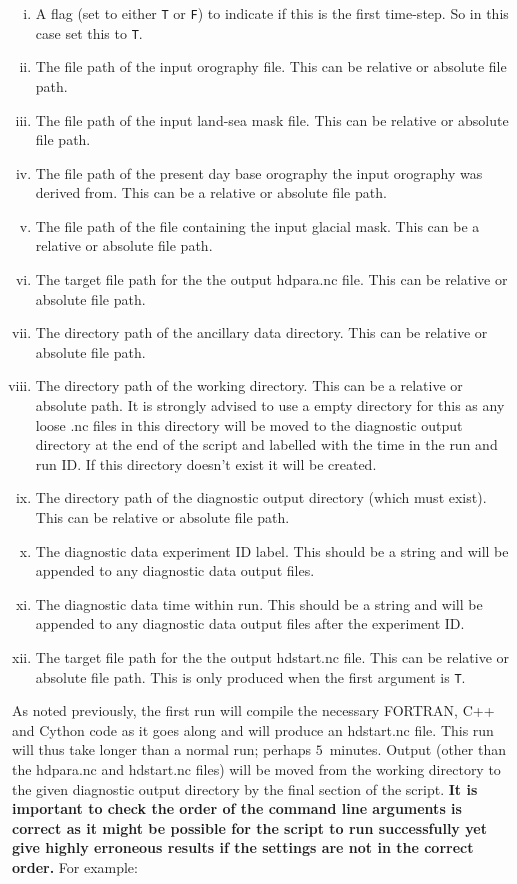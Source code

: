 \documentclass{article}
\begin{document}
\begin{enumerate}
\begin{enumerate}[i)]
\item A flag (set to either \texttt{T} or \texttt{F}) to indicate if this is the first time-step. So in this case set this to \texttt{T}.
\item The file path of the input orography file. This can be relative or absolute file path.
\item The file path of the input land-sea mask file. This can be relative or absolute file path.
\item The file path of the present day base orography the input orography was derived from. This can be a relative or absolute file path.
\item The file path of the file containing the input glacial mask. This can be a relative or absolute file path.
\item The target file path for the the output hdpara.nc file. This can be relative or absolute file path.
\item The directory path of the ancillary data directory. This can be relative or absolute file path.
\item The directory path of the working directory. This can be a relative or absolute path. It is strongly advised to use a empty directory for this as any loose .nc files in this directory will be moved to the diagnostic output directory at the end of the script and labelled with the time in the run and run ID. If this directory doesn't exist it will be created.
\item The directory path of the diagnostic output directory (which must exist). This can be relative or absolute file path.
\item The diagnostic data experiment ID label. This should be a string and will be appended to any diagnostic data output files.
\item The diagnostic data time within run. This should be a string and will be appended to any diagnostic data output files after the experiment ID.
\item The target file path for the the output hdstart.nc file. This can be relative or absolute file path. This is only produced when the first argument is  \texttt{T}.
\end{enumerate}
As noted previously, the first run will compile the necessary FORTRAN, C++ and Cython code as it goes along and will produce an hdstart.nc file. This run will thus take longer than a normal run; perhaps $5$~minutes. Output (other than the hdpara.nc and hdstart.nc files) will be moved from the working directory to the given diagnostic output directory by the final section of the script. \textbf{It is important to check the order of the command line arguments is correct as it might be possible for the script to run successfully yet give highly erroneous results if the settings are not in the correct order.} For example:

\end{enumerate}
\end{document}

